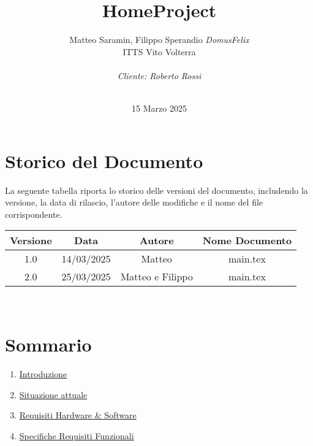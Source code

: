 \documentclass[italian, 12pt, a4paper]{article}
\title{\huge{HomeProject}}
\author{Matteo Saramin, Filippo Sperandio \textit{DomusFelix} \\ {\small ITTS Vito Volterra} \\ \\ \emph{Cliente: Roberto Rossi}}
\date{\version\\ 15 Marzo 2025}
\begin{document}
\maketitle %

\section{Storico del Documento}
La seguente tabella riporta lo storico delle versioni del documento, includendo la versione, la data di rilascio, l'autore delle modifiche e il nome del file corrispondente.

\begin{center}
    \renewcommand{\arraystretch}{1.5} %
    \begin{tabular}{|c|c|c|c|}
        \hline
        \rowcolor{violet!30}
        Versione & Data & Autore & Nome Documento \\
        \hline
        1.0 & 14/03/2025 & Matteo & main.tex \\
        \hline
        2.0&25/03/2025&Matteo e Filippo & main.tex \\
        \hline
    \end{tabular}\\[4mm]
\end{center}
\vspace{15mm}
\section{Sommario}
\begin{enumerate}
    \item \hyperref[sec:introduzione]{Introduzione}
    \item \hyperref[sec:situazione]{Situazione attuale}
    \item \hyperref[sec:requisiti]{Requisiti Hardware \& Software}
    \item \hyperref[sec:requisiti2]{Specifiche Requisiti Funzionali}
\end{enumerate}
\clearpage
\end{document}

